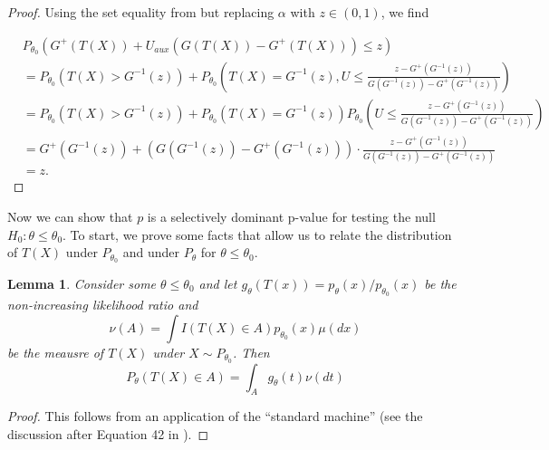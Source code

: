 \documentclass{article}
\newtheorem{lemma}{Lemma}
\begin{document}
\begin{appendix}
\begin{proof}

Using the set equality from  but replacing $\alpha$ with $z \in (0, 1)$, we find

\begin{align*}
        &P_{\theta_0}(G^+(T(X)) + U_{aux}(G(T(X)) - G^+(T(X))) \leq z)\\
        &= P_{\theta_0}(T(X) > G^{-1}(z)) + P_{\theta_0}\left(T(X) = G^{-1}(z),  U \leq \frac{z - G^+(G^{-1}(z))}{G(G^{-1}(z)) - G^{+}(G^{-1}(z))}\right)\\
        &= P_{\theta_0}(T(X) > G^{-1}(z)) + P_{\theta_0}(T(X) = G^{-1}(z)) P_{\theta_0}\left(U \leq \frac{z - G^+(G^{-1}(z))}{G(G^{-1}(z)) - G^{+}(G^{-1}(z))}\right)\\
        &=G^+(G^{-1}(z)) + (G(G^{-1}(z)) - G^{+}(G^{-1}(z))) \cdot \frac{z - G^+(G^{-1}(z))}{G(G^{-1}(z)) - G^{+}(G^{-1}(z))}\\
        &= z.
    \end{align*}

\end{proof}

Now we can show that $p$ is a selectively dominant p-value for testing the null $H_0: \theta \leq \theta_0$. To start, we prove some facts that allow us to relate the distribution of $T(X)$ under $P_{\theta_0}$ and under $P_{\theta}$ for $\theta \leq \theta_0$. 

\begin{lemma}
    \label{lem:stan_machine}
    Consider some $\theta \leq \theta_0$ and let $g_{\theta}(T(x)) = p_{\theta}(x)/p_{\theta_0}(x)$ be the non-increasing likelihood ratio and
    \begin{equation*}
        \nu(A) = \int I(T(X) \in A) p_{\theta_0}(x) \mu(dx)
    \end{equation*}
    be the meausre of $T(X)$ under $X \sim P_{\theta_0}$. Then 
    \begin{equation*}
        P_{\theta}(T(X) \in A) = \int_A g_{\theta}(t) \nu(dt)
    \end{equation*}
\end{lemma}

\begin{proof}
This follows from an application of the ``standard machine'' (see the discussion after Equation 42 in \cite{Lei}). 
\end{proof}



\end{appendix}
\end{document}
